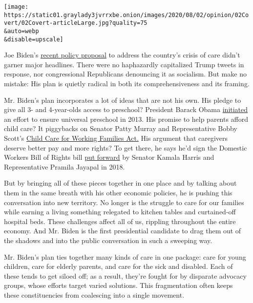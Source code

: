 \texttt{[image: https://static01.graylady3jvrrxbe.onion/images/2020/08/02/opinion/02Covert/02Covert-articleLarge.jpg?quality=75\\\&auto=webp\\\&disable=upscale]}

Joe Biden's
\href{https://www.cnbc.com/2020/07/21/biden-to-unveil-775-billion-plan-to-fund-child-care-and-elder-care.html}{recent
policy proposal} to address the country's crisis of care didn't garner
major headlines. There were no haphazardly capitalized Trump tweets in
response, nor congressional Republicans denouncing it as socialism. But
make no mistake: His plan is quietly radical in both its
comprehensiveness and its framing.

Mr. Biden's plan incorporates a lot of ideas that are not his own. His
pledge to give all 3- and 4-year-olds access to preschool? President
Barack Obama
\href{https://obamawhitehouse.archives.gov/the-press-office/2013/02/13/fact-sheet-president-obama-s-plan-early-education-all-americans}{initiated}
an effort to ensure universal preschool in 2013. His promise to help
parents afford child care? It piggybacks on Senator Patty Murray and
Representative Bobby Scott's
\href{https://www.help.senate.gov/imo/media/doc/CCFWFA\%20Fact\%20Sheet\%20116th\%20Congress\%20FINAL.pdf}{Child
Care for Working Families Act.} His argument that caregivers deserve
better pay and more rights? To get there, he says he'd sign the Domestic
Workers Bill of Rights bill
\href{https://www.thenation.com/article/archive/federal-domestic-workers-bill-of-rights-harris-jayapal-labor/}{put
forward} by Senator Kamala Harris and Representative Pramila Jayapal in
2018.

But by bringing all of these pieces together in one place and by talking
about them in the same breath with his other economic policies, he is
pushing this conversation into new territory. No longer is the struggle
to care for our families while earning a living something relegated to
kitchen tables and curtained-off hospital beds. These challenges affect
all of us, rippling throughout the entire economy. And Mr. Biden is the
first presidential candidate to drag them out of the shadows and into
the public conversation in such a sweeping way.

Mr. Biden's plan ties together many kinds of care in one package: care
for young children, care for elderly parents, and care for the sick and
disabled. Each of these tends to get siloed off; as a result, they're
fought for by disparate advocacy groups, whose efforts target varied
solutions. This fragmentation often keeps these constituencies from
coalescing into a single movement.

